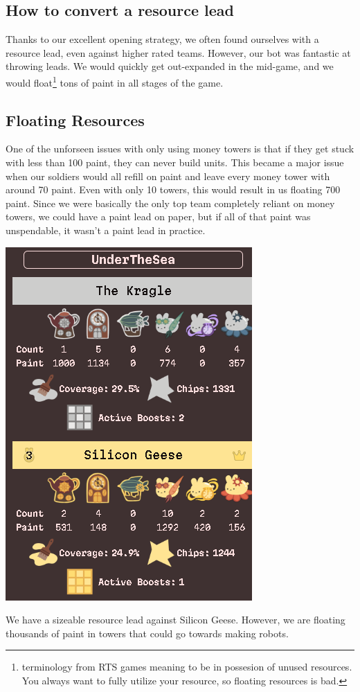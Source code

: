 \subsection{How to convert a resource lead}

Thanks to our excellent opening strategy, we often found ourselves with a resource lead, even against higher rated teams. However, our bot was fantastic at throwing leads. We would quickly get out-expanded in the mid-game, and we would float\footnote{terminology from RTS games meaning to be in possesion of unused resources. You always want to fully utilize your resource, so floating resources is bad.} tons of paint in all stages of the game.

\subsection{Floating Resources}

One of the unforseen issues with only using money towers is that if they get stuck with less than 100 paint, they can never build units. This became a major issue when our soldiers would all refill on paint and leave every money tower with around 70 paint. Even with only 10 towers, this would result in us floating 700 paint. Since we were basically the only top team completely reliant on money towers, we could have a paint lead on paper, but if all of that paint was unspendable, it wasn't a paint lead in practice.

\begin{center}
    \includegraphics[scale=0.1]{images/floating_resources.png}
    \caption{We have a sizeable resource lead against Silicon Geese. However, we are floating thousands of paint in towers that could go towards making robots.}
\end{center}

